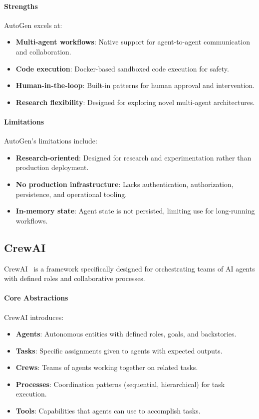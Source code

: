 \paragraph{Strengths}
AutoGen excels at:
\begin{itemize}
    \item \textbf{Multi-agent workflows}: Native support for agent-to-agent communication and collaboration.
    \item \textbf{Code execution}: Docker-based sandboxed code execution for safety.
    \item \textbf{Human-in-the-loop}: Built-in patterns for human approval and intervention.
    \item \textbf{Research flexibility}: Designed for exploring novel multi-agent architectures.
\end{itemize}

\paragraph{Limitations}
AutoGen's limitations include:
\begin{itemize}
    \item \textbf{Research-oriented}: Designed for research and experimentation rather than production deployment.
    \item \textbf{No production infrastructure}: Lacks authentication, authorization, persistence, and operational tooling.
    \item \textbf{In-memory state}: Agent state is not persisted, limiting use for long-running workflows.
\end{itemize}

\subsection{CrewAI}

CrewAI~%
is a framework specifically designed for orchestrating teams of AI agents with defined roles and collaborative processes.

\paragraph{Core Abstractions}
CrewAI introduces:
\begin{itemize}
    \item \textbf{Agents}: Autonomous entities with defined roles, goals, and backstories.
    \item \textbf{Tasks}: Specific assignments given to agents with expected outputs.
    \item \textbf{Crews}: Teams of agents working together on related tasks.
    \item \textbf{Processes}: Coordination patterns (sequential, hierarchical) for task execution.
    \item \textbf{Tools}: Capabilities that agents can use to accomplish tasks.
\end{itemize}


